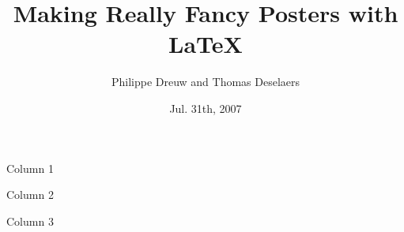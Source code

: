 \documentclass[final,hyperref={pdfpagelabels=false}]{beamer}
\title[Fancy Posters]{Making Really Fancy Posters with \LaTeX}
\author[Dreuw \& Deselaers]{Philippe Dreuw and Thomas Deselaers}
\institute[RWTH Aachen University]{Human Language Technology and Pattern Recognition,RWTH Aachen University}
\date{Jul. 31th, 2007}
\begin{document}
  \begin{frame}{} 
\maketitle
\begin{multicols}{3}
    \vfill
    \begin{block}{\large Column 1}
\lipsum[1]
    \end{block}
\columnbreak

    \begin{block}{\large Column 2}
\lipsum[2]
    \end{block}

    \begin{block}{\large Column 3}
\lipsum[3]
    \end{block}
\end{multicols}
  \end{frame}
  
\end{document}

